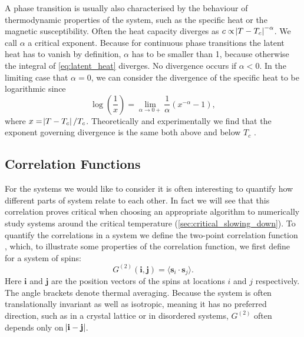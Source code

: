 \documentclass[11pt, a4paper]{report} %
\begin{document}
A phase transition is usually also characterised by the behaviour of thermodynamic properties of the system, such as the specific heat or the magnetic susceptibility.
Often the heat capacity diverges as \(c \propto \abs{T-T_c}^{-\alpha}\).
We call \(\alpha\) a critical exponent.
Because for continuous phase transitions the latent heat has to vanish by definition, \(\alpha\) has to be smaller than 1, because otherwise the integral of \cref{eq:latent_heat} diverges.
No divergence occurs if \(\alpha < 0\).
In the limiting case that \(\alpha = 0\), we can consider the divergence of the specific heat to be logarithmic since
\begin{equation}
	\log(\frac{1}{x}) = \lim_{\alpha \to 0+} \frac{1}{\alpha}\left(x^{-\alpha} - 1\right),
\end{equation}
where \(x = \abs{T - T_c}/T_c\).
Theoretically and experimentally we find that the exponent governing divergence is the same both above and below \(T_c\) \cite{binney:1992}.

\subsection{Correlation Functions}
For the systems we would like to consider it is often interesting to quantify how different parts of system relate to each other.
In fact we will see that this correlation proves critical when choosing an appropriate algorithm to numerically study systems around the critical temperature (\cref{sec:critical_slowing_down}).
To quantify the correlations in a system we define the two-point correlation function \cite{binney:1992}, which, to illustrate some properties of the correlation function, we first define for a system of spins:
\begin{equation}
	G^{(2)}(\mathbf{i}, \mathbf{j}) = \langle{\mathbf{s}_i \cdot \mathbf{s}_j}\rangle.
\end{equation}
Here \(\mathbf{i}\) and \(\mathbf{j}\) are the position vectors of the spins at locations \(i\) and \(j\) respectively.
The angle brackets denote thermal averaging.
Because the system is often translationally invariant as well as isotropic, meaning it has no preferred direction, such as in a crystal lattice or in disordered systems, \(G^{(2)}\) often depends only on \(\abs{\mathbf{i} - \mathbf{j}} \).
\end{document}
